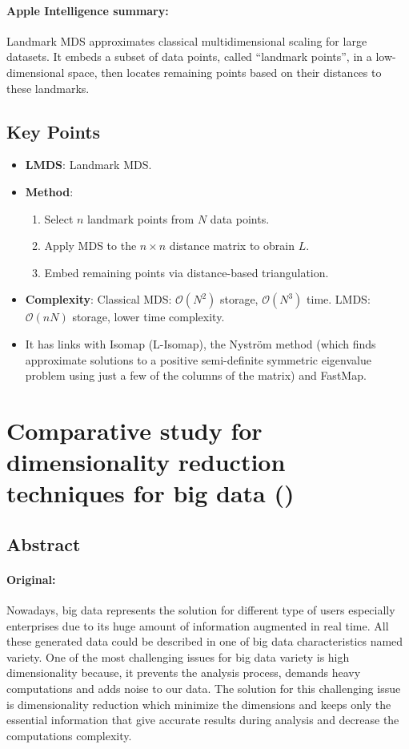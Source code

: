 \documentclass[a4paper,12pt]{article}
\begin{document}
\paragraph{Apple Intelligence summary:} Landmark MDS approximates classical multidimensional scaling for large datasets. It embeds a subset of data points, called “landmark points”, in a low-dimensional space, then locates remaining points based on their distances to these landmarks.


\subsection{Key Points}

\begin{itemize}
    \item \textbf{LMDS}: Landmark MDS.
    \item \textbf{Method}:
        \begin{enumerate}
            \item Select $n$ landmark points from $N$ data points.
            \item Apply MDS to the $n \times n$ distance matrix to obrain $L$.
            \item Embed remaining points via distance-based triangulation.
        \end{enumerate}
    \item \textbf{Complexity}: Classical MDS: $\mathcal{O}(N^2)$ storage, $\mathcal{O}(N^3)$ time. LMDS: $\mathcal{O}(nN)$ storage, lower time complexity.
    \item It has links with Isomap (L-Isomap), the Nyström method (which finds approximate solutions to a positive semi-definite symmetric eigenvalue problem using just a few of the columns of the matrix) and FastMap.
\end{itemize}


\pagebreak
\section{Comparative study for dimensionality reduction techniques for big data (\texorpdfstring{\cite{Salah2020}}{})}
\label{sec:SalahHenouda2020}

\subsection{Abstract}

\paragraph{Original:} Nowadays, big data represents the solution for different type of users especially enterprises due to its huge amount of information augmented in real time. All these generated data could be described in one of big data characteristics named variety. One of the most challenging issues
for big data variety is high dimensionality because, it prevents the analysis process, demands heavy computations and adds noise to our data. The solution for this challenging issue is dimensionality reduction which minimize the dimensions and keeps only the essential information that give accurate results during analysis and decrease the computations complexity.
\end{document}
